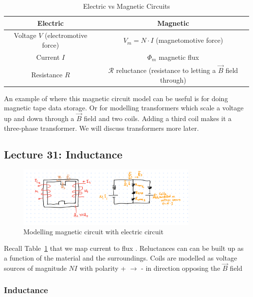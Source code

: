 \documentclass[10pt]{article}
\begin{document}
\begin{table}[H]
	\centering
	\caption{Electric vs Magnetic Circuits}
	\label{tab:259:electric_vs_magnetic_circuits}
	\begin{tabular}{|c|c|}
		\hline
		Electric & Magnetic \\ \hline
		Voltage $ V $  (electromotive force) & $ V_m = N \cdot I $ (magnetomotive force) \\
		Current $ I $  & $\Phi_m$ magnetic flux \\
		Resistance $ R $ & $ \mathcal{R} $ reluctance (resistance to letting a $ \vec{B} $ field through) \\
		\hline
	\end{tabular}
\end{table}

An example of where this magnetic circuit model can be useful is for doing magnetic tape data storage.
Or for modelling transformers which scale a voltage up and down through a $ \vec{B} $ field and two coils. 
Adding a third coil makes it a three-phase transformer.
We will discuss transformers more later.

\subsection{Lecture 31: Inductance}

\begin{figure}[H]
	\centering
	\includegraphics[width=0.8\textwidth]{img/259_equiv_induct.png}
	\caption{Modelling magnetic circuit with electric circuit}
	\label{fig:img-}
\end{figure}

Recall Table~\ref{tab:259:electric_vs_magnetic_circuits} that we map current to flux .
Reluctances can can be built up as a function of the material and the surroundings. Coils are modelled as voltage sources of magnitude $ NI $ with polarity + $ \to  $ - in direction opposing the $ \vec{B} $ field 


\subsubsection{Inductance}
\end{document}
